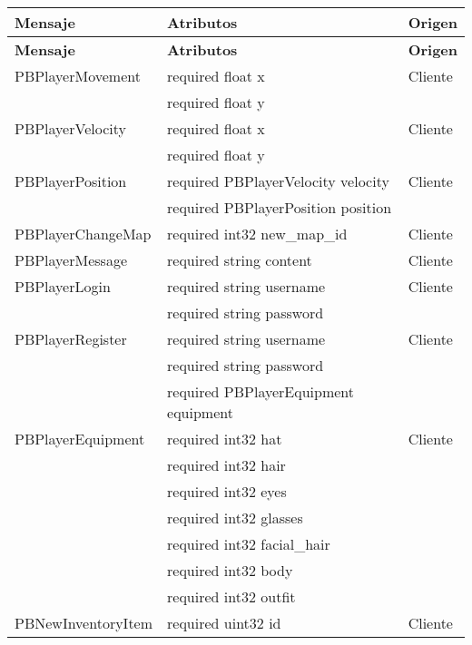 \label{apendix:protobuf}
\begin{longtable}{|p{}|p{}|p{}|}
    \hline
    \textbf{Mensaje} & \textbf{Atributos} & \textbf{Origen} \\ \hline
    \endfirsthead
    \hline
    \textbf{Mensaje} & \textbf{Atributos} & \textbf{Origen} \\\hline
    \endhead
    \hline
    \endfoot
    \hline
    \endlastfoot
    
    \hline
    PBPlayerMovement & required float x & Cliente \\
                        & required float y & \\
    \hline
    PBPlayerVelocity & required float x & Cliente \\
                        & required float y & \\
    \hline
    PBPlayerPosition & required PBPlayerVelocity velocity & Cliente \\
                        & required PBPlayerPosition position & \\
    \hline
    PBPlayerChangeMap & required int32 new\_map\_id & Cliente \\
    \hline
    PBPlayerMessage & required string content & Cliente \\
    \hline
    PBPlayerLogin & required string username & Cliente \\
                    & required string password & \\
    \hline
    PBPlayerRegister & required string username & Cliente \\
                        & required string password & \\
                        & required PBPlayerEquipment equipment & \\
    \hline
    PBPlayerEquipment & required int32 hat & Cliente \\
                        & required int32 hair & \\
                        & required int32 eyes & \\
                        & required int32 glasses & \\
                        & required int32 facial\_hair & \\
                        & required int32 body & \\
                        & required int32 outfit & \\
    \hline
    PBNewInventoryItem & required uint32 id & Cliente \\

\end{longtable}
